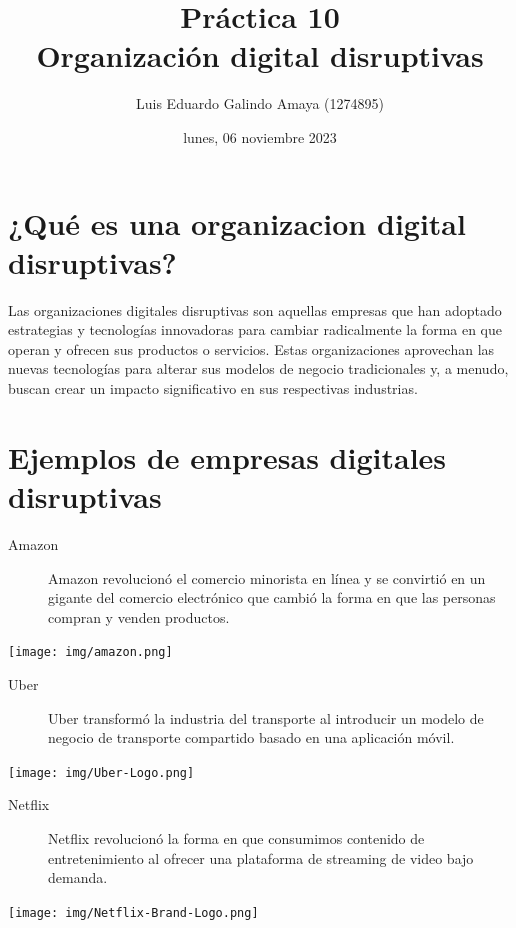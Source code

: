 \documentclass[11pt]{article}
\author{Luis Eduardo Galindo Amaya (1274895)}
\date{lunes, 06 noviembre 2023}
\title{Práctica 10\\\medskip
\large Organización digital disruptivas}
\begin{document}
\makeatletter
\makeatletter
{}


\section{¿Qué es una organizacion digital disruptivas?}
\label{sec:org2ff1155}
\autocite{Ruiz_2020} Las organizaciones digitales disruptivas son aquellas empresas que han
adoptado estrategias y tecnologías innovadoras para cambiar
radicalmente la forma en que operan y ofrecen sus productos o
servicios. Estas organizaciones aprovechan las nuevas tecnologías para
alterar sus modelos de negocio tradicionales y, a menudo, buscan crear
un impacto significativo en sus respectivas industrias.


\section{Ejemplos de empresas digitales disruptivas}
\label{sec:org227016a}
\begin{description}
\item[{Amazon}] Amazon revolucionó el comercio minorista en línea y se
convirtió en un gigante del comercio electrónico que cambió la forma
en que las personas compran y venden productos.
\end{description}

\begin{center}
\texttt{[image: img/amazon.png]}
\end{center}

\begin{description}
\item[{Uber}] Uber transformó la industria del transporte al introducir un
modelo de negocio de transporte compartido basado en una aplicación
móvil.
\end{description}

\begin{center}
\texttt{[image: img/Uber-Logo.png]}
\end{center}

\begin{description}
\item[{Netflix}] Netflix revolucionó la forma en que consumimos contenido
de entretenimiento al ofrecer una plataforma de streaming de video
bajo demanda.
\end{description}

\begin{center}
\texttt{[image: img/Netflix-Brand-Logo.png]}
\end{center}  
\end{document}
